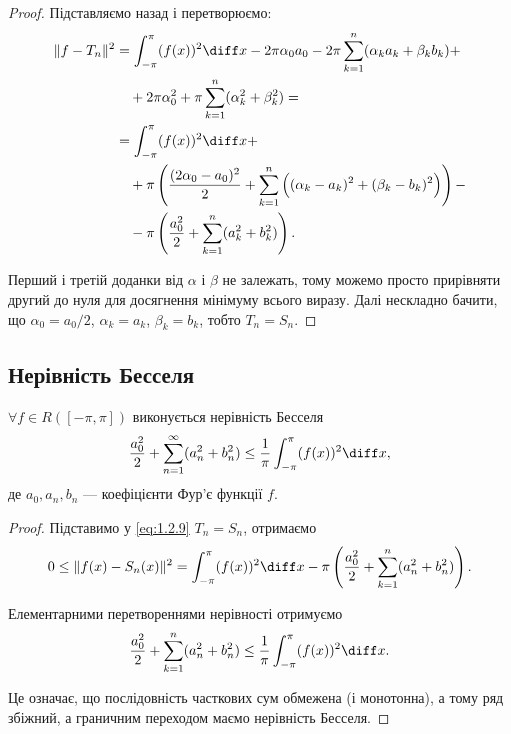 \begin{proof}
    Підставляємо назад і перетворюємо:
    \begin{equation}
        \label{eq:1.2.9}
        \begin{aligned}
            \|f - T_n\|^2 
            &= \int_{-\pi}^\pi (f(x))^2 \diff x - 2 \pi \alpha_0 a_0 - 2 \pi \sum_{k = 1}^n (\alpha_k a_k + \beta_k b_k) + \\
            &\quad + 2 \pi \alpha_0^2 + \pi \sum_{k = 1}^n (\alpha_k^2 + \beta_k^2) = \\
            &= \int_{-\pi}^\pi (f(x))^2 \diff x + \\
            &\quad + \pi \left( \frac{(2\alpha_0 - a_0)^2}{2} + \sum_{k = 1}^n \Big( (\alpha_k - a_k)^2 + (\beta_k - b_k)^2 \Big) \right) - \\ 
            &\quad - \pi \left( \frac{a_0^2}{2} + \sum_{k = 1}^n (a_k^2 + b_k^2) \right).
        \end{aligned}
    \end{equation}
    
    Перший і третій доданки від $\alpha$ і $\beta$ не залежать, тому можемо просто прирівняти другий до нуля для досягнення мінімуму всього виразу. Далі нескладно бачити, що $\alpha_0 = a_0 / 2$, $\alpha_k = a_k$, $\beta_k = b_k$, тобто $T_n = S_n$.
\end{proof}

\subsection{Нерівність Бесселя}

\begin{theorem}
    $\forall f \in R([-\pi,\pi])$ виконується нерівність Бесселя
    \begin{equation}
        \frac{a_0^2}{2} + \sum_{n = 1}^\infty (a_n^2 + b_n^2) \le \frac{1}{\pi} \int_{-\pi}^\pi (f(x))^2 \diff x,
    \end{equation}
    де $a_0, a_n, b_n$ --- коефіцієнти Фур'є функції $f$.
\end{theorem}
\begin{proof}
    Підставимо у \eqref{eq:1.2.9} $T_n = S_n$, отримаємо
    \begin{equation}
        0 \le \|f(x) - S_n(x)\|^2 = \int_{-\pi}^\pi (f(x))^2 \diff x - \pi \left( \frac{a_0^2}{2} + \sum_{k = 1}^n (a_n^2 + b_n^2) \right).
    \end{equation}
    
    Елементарними перетвореннями нерівності отримуємо
    \begin{equation}
        \frac{a_0^2}{2} + \sum_{k = 1}^n (a_n^2 + b_n^2) \le \frac{1}{\pi} \int_{-\pi}^\pi (f(x))^2 \diff x.
    \end{equation}
    
    Це означає, що послідовність часткових сум обмежена (і монотонна), а тому ряд збіжний, а граничним переходом маємо нерівність Бесселя.
\end{proof}

